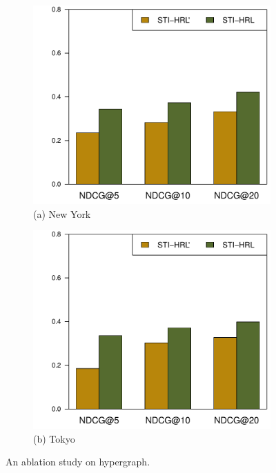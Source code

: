\documentclass[letterpaper]{article} %
\begin{document}
\begin{figure}[!th]
\centering
\begin{subfigure}{.24\textwidth}
  \centering
  \includegraphics[width=\linewidth]{6_nyc.pdf}
  \scriptsize (a) New York
\end{subfigure}%
\begin{subfigure}{.24\textwidth}
  \centering
  \includegraphics[width=\linewidth]{6_tky.pdf}
  \scriptsize (b) Tokyo
\end{subfigure}
\caption{An ablation study on hypergraph.}
\label{fig:ablation study on hypergarph}
\end{figure}
\end{document}
